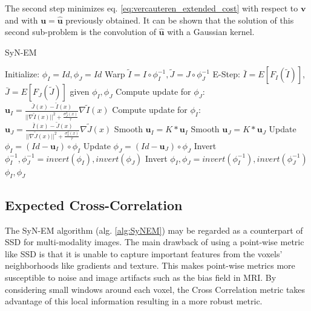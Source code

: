 The second step minimizes eq. \ref{eq:vercauteren_extended_cost} with respect to $\mathbf{v}$ and with $\mathbf{u}=\widehat{\mathbf{u}}$ previously obtained. It can be
shown that the solution of this second sub-problem is the convolution of $\widehat{\mathbf{u}}$ with a Gaussian kernel\cite{Vercauteren2009}.\\

\begin{algorithm}[h!]
\caption{SyN-EM}\label{alg:SyNEM}
\begin{algorithmic}[1]
\STATE Initialize: $\phi_{I} = Id, \phi_{J} = Id$
\REPEAT
    \STATE Warp $\tilde{I}  = I \circ \phi_{I}^{-1}, \tilde{J} = J \circ \phi_{J}^{-1}$
    \STATE E-Step: $\bar{I} = E[F_{I}(\tilde{I})]$, $\bar{J} = E[F_{J}(\tilde{J})]$ given $\phi_{I}, \phi_{J}$
    \STATE Compute update for $\phi_{J}$: $\mathbf{u}_{I} = \frac{\bar{J}(x) - \tilde{I}(x)}{||\nabla \tilde{I}(x)||^{2} + \frac{\sigma_{J}^{2}(x)}{\tau}}\nabla \tilde{I}(x)$
    \STATE Compute update for $\phi_{I}$: $\mathbf{u}_{J} = \frac{\bar{I}(x) - \tilde{J}(x)}{||\nabla \tilde{J}(x)||^{2} + \frac{\sigma_{I}^{2}(x)}{\tau}}\nabla \tilde{J}(x)$
    \STATE Smooth $\mathbf{u}_{I} = K \ast \mathbf{u}_{I}$
    \STATE Smooth $\mathbf{u}_{J} = K \ast \mathbf{u}_{J}$
    \STATE Update $\phi_{I} = (Id - \mathbf{u}_{I}) \circ \phi_{I}$
    \STATE Update $\phi_{J} = (Id - \mathbf{u}_{J}) \circ \phi_{J}$
    \STATE Invert $\phi_{I}^{-1}, \phi_{J}^{-1} = invert(\phi_{I}), invert(\phi_{J})$
    \STATE Invert $\phi_{I}, \phi_{J} = invert(\phi_{I}^{-1}), invert(\phi_{J}^{-1})$
\RETURN $\phi_{I}, \phi_{J}$
\end{algorithmic}
\end{algorithm}


\subsection{Expected Cross-Correlation}
The SyN-EM algorithm (alg. \ref{alg:SyNEM}) may be regarded as a counterpart of SSD for multi-modality images. The main drawback of using a point-wise metric like SSD is that
it is unable to capture important features from the voxels' neighborhoods like gradients and texture. This makes point-wise metrics more susceptible to noise and image artifacts
such as the bias field in MRI. By considering small windows around each voxel, the Cross Correlation metric takes advantage of this local information resulting in a more robust
metric.\\

